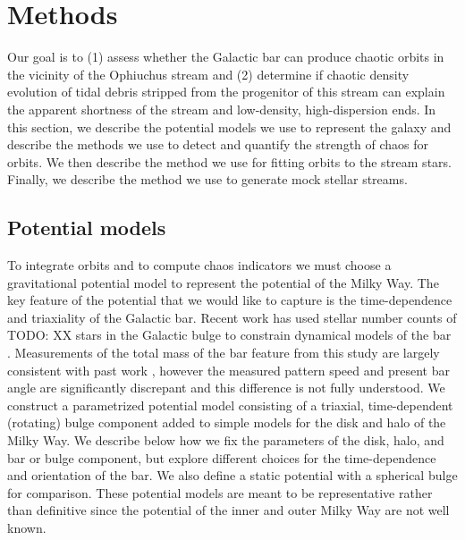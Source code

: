 \documentclass[letterpaper,12pt,preprint]{aastex}
\newcommand{\todo}[1]{{\color{red} TODO: #1}}
\begin{document}
\section{Methods}\label{sec:method}

Our goal is to (1) assess whether the Galactic bar can produce chaotic orbits in the vicinity of the Ophiuchus stream and (2) determine if chaotic density evolution of tidal debris stripped from the progenitor of this stream can explain the apparent shortness of the stream and low-density, high-dispersion ends. In this section, we describe the potential models we use to represent the galaxy and describe the methods we use to detect and quantify the strength of chaos for orbits. We then describe the method we use for fitting orbits to the stream stars. Finally, we describe the method we use to generate mock stellar streams. 

\subsection{Potential models}\label{sec:potential}

To integrate orbits and to compute chaos indicators we must choose a gravitational potential model to represent the potential of the Milky Way. The key feature of the potential that we would like to capture is the time-dependence and triaxiality of the Galactic bar. Recent work has used stellar number counts of \todo{XX} stars in the Galactic bulge to constrain dynamical models of the bar \citep{portail15}. Measurements of the total mass of the bar feature from this study are largely consistent with past work \citep[e.g.,][]{XX}, however the measured pattern speed and present bar angle are significantly discrepant and this difference is not fully understood. We construct a parametrized potential model consisting of a triaxial, time-dependent (rotating) bulge component added to simple models for the disk and halo of the Milky Way. We describe below how we fix the parameters of the disk, halo, and bar or bulge component, but explore different choices for the time-dependence and orientation of the bar. We also define a static potential with a spherical bulge for comparison. These potential models are meant to be representative rather than definitive since the potential of the inner and outer Milky Way are not well known. 
\end{document}
